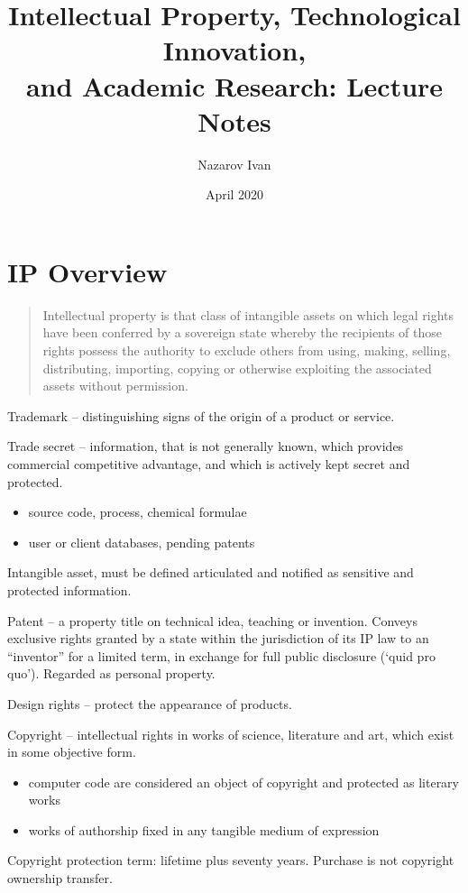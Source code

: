 \documentclass[10pt,a4paper,twocolumn]{article}
\title{
  Intellectual Property, Technological Innovation,
  \\ and Academic Research: Lecture Notes
}
\author{Nazarov Ivan}
\date{April 2020}
\begin{document}
\maketitle

\section{IP Overview} %
\label{sec:intellectual_property_overview}

\begin{quote}
  Intellectual property is that class of intangible assets on which legal rights have
  been conferred by a sovereign state whereby the recipients of those rights possess
  the authority to exclude others from using, making, selling, distributing, importing,
  copying or otherwise exploiting the associated assets without permission.
\end{quote}

Trademark -- distinguishing signs of the origin of a product or service.

Trade secret -- information, that is not generally known, which provides commercial
competitive advantage, and which is actively kept secret and protected.
\begin{itemize}
  \item source code, process, chemical formulae
  \item user or client databases, pending patents
\end{itemize}
Intangible asset, must be defined articulated and notified as sensitive and protected
information.

Patent -- a property title on technical idea, teaching or invention. Conveys exclusive
rights granted by a state within the jurisdiction of its IP law to an ``inventor'' for
a limited term, in exchange for full public disclosure (`quid pro quo'). Regarded as
personal property.

Design rights -- protect the appearance of products.

Copyright -- intellectual rights in works of science, literature and art, which exist
in some objective form.
\begin{itemize}
  \item computer code are considered an object of copyright and protected as literary
  works
  \item works of authorship fixed in any tangible medium of expression
\end{itemize}
Copyright protection term: lifetime plus seventy years. Purchase is not copyright ownership
transfer.
\end{document}

